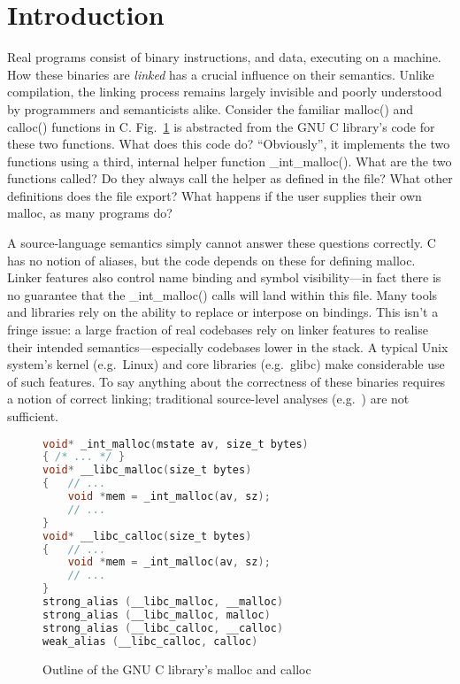 \section{Introduction}

Real programs consist of binary instructions, and data, executing on a machine.
How these binaries are \emph{linked} has a crucial influence on their semantics.
Unlike compilation, the linking process remains largely invisible and poorly understood 
by programmers and semanticists alike.
Consider the familiar \textsf{malloc()} and \textsf{calloc()} functions in C.
Fig.~\ref{fig:glibc-malloc} is abstracted from the GNU C library's code for these two functions.
What does this code do?
``Obviously'', it implements the two functions using a third, internal helper function \textsf{\_int\_malloc()}.
What are the two functions called? 
Do they always call the helper as defined in the file?
What other definitions does the file export?
What happens if the user supplies their own \textsf{malloc}, as many programs do?

A source-language semantics simply cannot answer these questions correctly. 
C has no notion of aliases, but the code depends on these for defining \textsf{malloc}.
Linker features also control name binding and symbol visibility---in fact there is no guarantee that the \textsf{\_int\_malloc()} calls will land within this file.
Many tools and libraries rely on the ability to replace or interpose on bindings.
This isn't a fringe issue: a large fraction of real codebases rely on linker features to realise their intended semantics---especially codebases lower in the stack. 
A typical Unix system's kernel (e.g.\ Linux) and core libraries (e.g.\ \textsf{glibc}) make considerable use of such features.
To say anything about the correctness of these binaries requires a notion of correct linking; 
traditional source-level analyses (e.g.~\cite{hoare-axiomatic-1969, reynolds-separation-2002}) are not sufficient.

\begin{figure}[t]
\begin{lstlisting}[language=C,basicstyle=\footnotesize\sffamily,columns=flexible]
void* _int_malloc(mstate av, size_t bytes)
{ /* ... */ }
void* __libc_malloc(size_t bytes)
{   // ...
    void *mem = _int_malloc(av, sz);
    // ...
}
void* __libc_calloc(size_t bytes)
{   // ...
    void *mem = _int_malloc(av, sz);
    // ...
}
strong_alias (__libc_malloc, __malloc) 
strong_alias (__libc_malloc, malloc)
strong_alias (__libc_calloc, __calloc) 
weak_alias (__libc_calloc, calloc)
\end{lstlisting}
\caption{Outline of the GNU C library's \textsf{malloc} and \textsf{calloc}}
\label{fig:glibc-malloc}
\end{figure}

